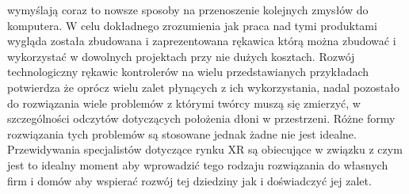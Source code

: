wymyślają coraz to nowsze sposoby na przenoszenie kolejnych zmysłów do komputera. W celu dokładnego zrozumienia jak praca nad tymi produktami wygląda została zbudowana i zaprezentowana rękawica którą można zbudować i wykorzystać w dowolnych projektach przy nie dużych kosztach. Rozwój technologiczny rękawic kontrolerów na wielu przedstawianych przykładach potwierdza że oprócz wielu zalet płynących z ich wykorzystania, nadal pozostało do rozwiązania wiele problemów z którymi twórcy muszą się zmierzyć, w szczególności odczytów dotyczących położenia dłoni w przestrzeni. Różne formy rozwiązania tych problemów są stosowane jednak żadne nie jest idealne. Przewidywania specjalistów dotyczące rynku XR są obiecujące w związku z czym jest to idealny moment aby wprowadzić tego rodzaju rozwiązania do własnych firm i domów aby wspierać rozwój tej dziedziny jak i doświadczyć jej zalet. 